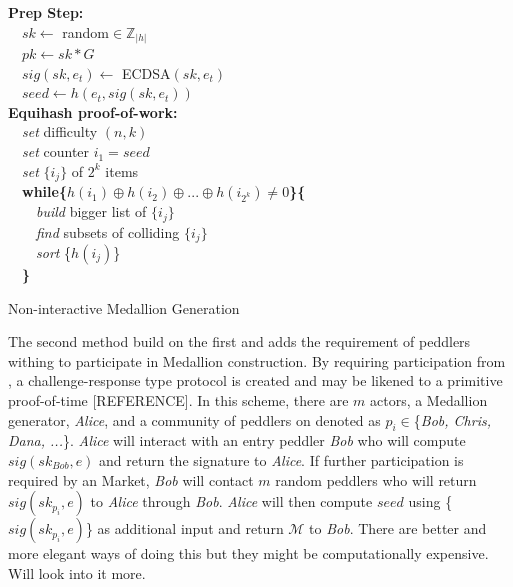 \begin{algorithm}[H]


   \textbf{Prep Step:}\\
    ~~$sk\gets$ random$\in \mathbb{Z}_{|h|}$\\
    ~~$pk\gets sk*G$\\
    ~~$sig(sk,e_t)\gets$ ECDSA$(sk,e_t)$\\
    ~~$seed\gets h(e_t, sig(sk,e_t))$ \\
   \textbf{Equihash proof-of-work:}\\
    ~~\textit{set} difficulty $(n,k)$\\
    ~~\textit{set} counter $i_1 = seed$\\
    ~~\textit{set} $\{i_j\}$ of $2^k$ items\\
    ~~\textbf{while\{}$h(i_1) \oplus h(i_2) \oplus ...\oplus h(i_{2^k}) \neq 0$\textbf{\}\{}\\
     ~~~~\textit{build} bigger list of $\{i_j\}$\\
     ~~~~\textit{find} subsets of colliding $\{i_j\}$\\
     ~~~~\textit{sort} \{$h(i_j)$\}\\
    ~~\textbf{\}}\\
    
   \caption{Non-interactive Medallion Generation}
\end{algorithm}

The second method build on the first and adds the requirement of peddlers withing \tOM{} to participate in Medallion construction. By requiring participation from \tOM{}, a challenge-response type protocol is created and may be likened to a primitive proof-of-time {\color{red}[REFERENCE]}. In this scheme, there are $m$ actors, a Medallion generator, \textit{Alice}, and a community of peddlers on \tOM{} denoted as $p_i \in$\{\textit{Bob, Chris, Dana, ...}\}. \textit{Alice} will interact with an entry peddler \textit{Bob} who will compute $sig(sk_{Bob}, e)$ and return the signature to \textit{Alice}. If further participation is required by an \Orchid{} Market, \textit{Bob} will contact $m$ random peddlers who will return $sig(sk_{p_i}, e)$ to \textit{Alice} through  \textit{Bob}. \textit{Alice} will then compute $seed$ using \{$sig(sk_{p_i}, e)$\} as additional input and return $\mathcal{M}$ to \textit{Bob}. {\color{red}There are better and more elegant ways of doing this but they might be computationally expensive. Will look into it more.}

